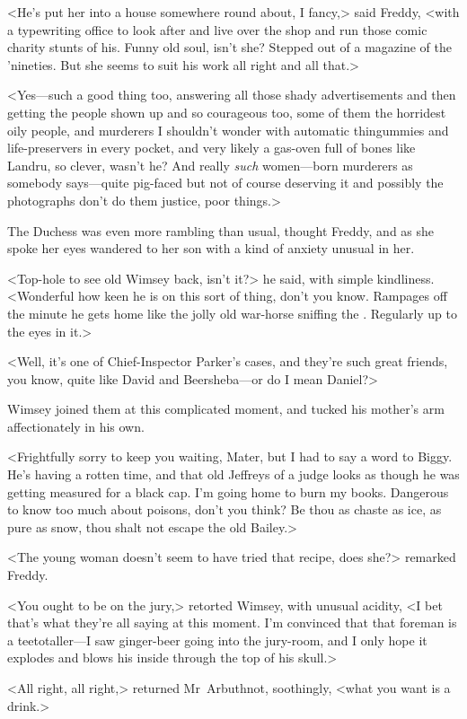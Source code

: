 <He's put her into a house somewhere round about, I fancy,> said Freddy, <with a typewriting office to look after and live over the shop and run those comic charity stunts of his. Funny old soul, isn't she? Stepped out of a magazine of the 'nineties. But she seems to suit his work all right and all that.>

<Yes—such a good thing too, answering all those shady advertisements and then getting the people shown up and so courageous too, some of them the horridest oily people, and murderers I shouldn't wonder with automatic thingummies and life-preservers in every pocket, and very likely a gas-oven full of bones like Landru, so clever, wasn't he? And really \textit{such} women—born murderers as somebody says—quite pig-faced but not of course deserving it and possibly the photographs don't do them justice, poor things.>

The Duchess was even more rambling than usual, thought Freddy, and as she spoke her eyes wandered to her son with a kind of anxiety unusual in her.

<Top-hole to see old Wimsey back, isn't it?> he said, with simple kindliness. <Wonderful how keen he is on this sort of thing, don't you know. Rampages off the minute he gets home like the jolly old war-horse sniffing the . Regularly up to the eyes in it.>

<Well, it's one of Chief-Inspector Parker's cases, and they're such great friends, you know, quite like David and Beersheba—or do I mean Daniel?>

Wimsey joined them at this complicated moment, and tucked his mother's arm affectionately in his own.

<Frightfully sorry to keep you waiting, Mater, but I had to say a word to Biggy. He's having a rotten time, and that old Jeffreys of a judge looks as though he was getting measured for a black cap. I'm going home to burn my books. Dangerous to know too much about poisons, don't you think? Be thou as chaste as ice, as pure as snow, thou shalt not escape the old Bailey.>

<The young woman doesn't seem to have tried that recipe, does she?> remarked Freddy.

<You ought to be on the jury,> retorted Wimsey, with unusual acidity, <I bet that's what they're all saying at this moment. I'm convinced that that foreman is a teetotaller—I saw ginger-beer going into the jury-room, and I only hope it explodes and blows his inside through the top of his skull.>

<All right, all right,> returned Mr~Arbuthnot, soothingly, <what you want is a drink.>